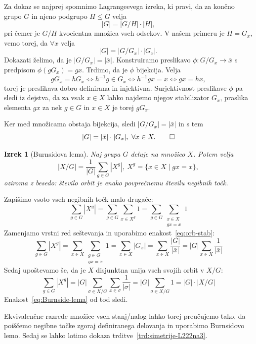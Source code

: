 \documentclass[12pt,a4paper]{amsart}
\theoremstyle{definition} %
\theoremstyle{plain} %
\newtheorem{izrek}[definicija]{Izrek}
\begin{document}
\proof
    Za dokaz se najprej spomnimo Lagrangeevega izreka, ki pravi, da za končno grupo $G$ in njeno podgrupo $H \leq G$ velja
    \[ |G| = |G/H| \cdot |H|, \]
    pri čemer je $G/H$ kvocientna množica vseh odsekov.
    V našem primeru je $H = G_x$, vemo torej, da $\forall x$ velja
    \[ |G| = |G/G_x| \cdot |G_x|. \]
    Dokazati želimo, da je $|G/G_x| = |\bar{x}|.$ Konstruiramo preslikavo $\phi \colon G/G_x \rightarrow \bar{x}$ s predpisom $\phi(gG_x) = gx$. Trdimo, da je $\phi$ bijekcija. Velja
    \[ gG_x=hG_x \iff h^{-1}g \in G_x \iff h^{-1}gx=x \iff gx=hx, \]
    torej je preslikava dobro definirana in injektivna. Surjektivnost preslikave $\phi$ pa sledi iz dejstva, da za vsak $x \in X$ lahko najdemo njegov stabilizator $G_x$, praslika elementa $gx$ za nek $g \in G$ in $x \in X$ je torej $gG_x$. 
    
    Ker med množicama obstaja bijekcija, sledi $|G/G_x| = |\bar{x}|$ in s tem
    \[ |G| = |\bar{x}| \cdot |G_x|,\ \forall x \in X. \qedhere \]
\endproof

\begin{izrek}[Burnsidova lema]
    Naj grupa $G$ deluje na množico $X$. Potem velja
    \begin{equation}
        |X/G| = \frac{1}{|G|} \sum_{g \in G} |X^g|, \ X^g=\{ x \in X \mid gx = x \},
        \label{eq:Burnside-lema}
    \end{equation}
    oziroma z besedo: število orbit je enako povprečnemu številu negibnih točk.
\end{izrek}

\proof
    Zapišimo vsoto vseh negibnih točk malo drugače:
    \[
        \sum_{g \in G} |X^g| = \sum_{g \in G} \sum_{x \in X^g} 1 = \sum_{g \in G} \sum_{\substack{x \in X \\ gx = x}} 1  
    \]
    Zamenjamo vrstni red seštevanja in uporabimo enakost~\eqref{eq:orb-stab}:
    \[
        \sum_{g \in G} |X^g| = \sum_{x \in X} \sum_{\substack{g \in G \\ gx = x}} 1 = 
        \sum_{x \in X} |G_x| = \sum_{x \in X} \frac{|G|}{|\bar{x}|} = |G| \sum_{x \in X} \frac{1}{|\bar{x}|}
    \]
    Sedaj upoštevamo še, da je $X$ disjunktna unija vseh svojih orbit v $X/G$:
    \[
        \sum_{g \in G} |X^g| = |G| \sum_{\sigma \in X/G} \sum_{x \in \sigma} \frac{1}{|\sigma|} = |G| \sum_{\sigma \in X/G} 1 = |G| \cdot |X/G| 
    \]
    Enakost~\eqref{eq:Burnside-lema} od tod sledi.
\endproof

Ekvivalenčne razrede množice vseh stanj/nalog lahko torej preučujemo tako, da poiščemo negibne točke zgoraj definiranega delovanja in uporabimo Burnsidovo lemo. Sedaj se lahko lotimo dokaza trditve~\ref{trd:simetrije-L222na3}.
\end{document}
